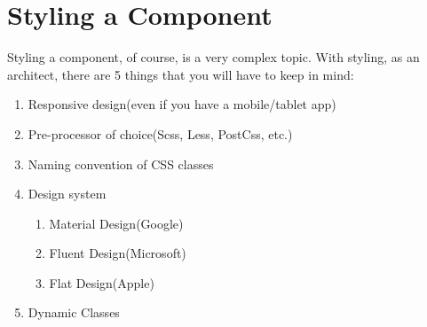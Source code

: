 \maketitle{}
\section{ Styling a Component }

Styling a component, of course, is a very complex topic. With styling, as an
architect, there are 5 things that you will have to keep in mind:
\begin{enumerate}
  \item Responsive design(even if you have a mobile/tablet app)
  \item Pre-processor of choice(Scss, Less, PostCss, etc.)
  \item Naming convention of CSS classes
  \item Design system
    \begin{enumerate}
      \item Material Design(Google)
      \item Fluent Design(Microsoft)
      \item Flat Design(Apple)
    \end{enumerate}
  \item Dynamic Classes
\end{enumerate}
